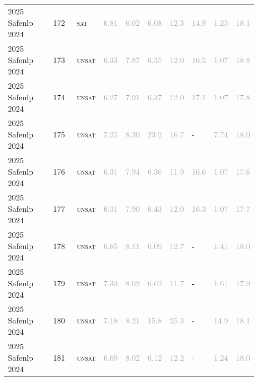 \begin{center}
{\begin{longtable}{@{}llllllllll@{}}
2025 Safenlp 2024 & 172 & ~\textsc{sat} & \textcolor{darkgray}{6.81} & \textcolor{darkgray}{6.02} & \textcolor{darkgray}{6.08} & \textcolor{darkgray}{12.3} & \textcolor{darkgray}{14.9} & \textcolor{darkgray}{1.25} & \textcolor{darkgray}{18.1} \\
2025 Safenlp 2024 & 173 & ~\textsc{unsat} & \textcolor{darkgray}{6.33} & \textcolor{darkgray}{7.87} & \textcolor{darkgray}{6.35} & \textcolor{darkgray}{12.0} & \textcolor{darkgray}{16.5} & \textcolor{darkgray}{1.07} & \textcolor{darkgray}{18.8} \\
2025 Safenlp 2024 & 174 & ~\textsc{unsat} & \textcolor{darkgray}{6.27} & \textcolor{darkgray}{7.91} & \textcolor{darkgray}{6.37} & \textcolor{darkgray}{12.0} & \textcolor{darkgray}{17.1} & \textcolor{darkgray}{1.07} & \textcolor{darkgray}{17.8} \\
2025 Safenlp 2024 & 175 & ~\textsc{unsat} & \textcolor{darkgray}{7.25} & \textcolor{darkgray}{8.30} & \textcolor{darkgray}{23.2} & \textcolor{darkgray}{16.7} & - & \textcolor{darkgray}{7.74} & \textcolor{darkgray}{18.0} \\
2025 Safenlp 2024 & 176 & ~\textsc{unsat} & \textcolor{darkgray}{6.31} & \textcolor{darkgray}{7.94} & \textcolor{darkgray}{6.36} & \textcolor{darkgray}{11.9} & \textcolor{darkgray}{16.6} & \textcolor{darkgray}{1.07} & \textcolor{darkgray}{17.6} \\
2025 Safenlp 2024 & 177 & ~\textsc{unsat} & \textcolor{darkgray}{6.31} & \textcolor{darkgray}{7.90} & \textcolor{darkgray}{6.43} & \textcolor{darkgray}{12.0} & \textcolor{darkgray}{16.3} & \textcolor{darkgray}{1.07} & \textcolor{darkgray}{17.7} \\
2025 Safenlp 2024 & 178 & ~\textsc{unsat} & \textcolor{darkgray}{6.85} & \textcolor{darkgray}{8.11} & \textcolor{darkgray}{6.09} & \textcolor{darkgray}{12.7} & - & \textcolor{darkgray}{1.41} & \textcolor{darkgray}{18.0} \\
2025 Safenlp 2024 & 179 & ~\textsc{unsat} & \textcolor{darkgray}{7.33} & \textcolor{darkgray}{8.02} & \textcolor{darkgray}{6.62} & \textcolor{darkgray}{11.7} & - & \textcolor{darkgray}{1.61} & \textcolor{darkgray}{17.9} \\
2025 Safenlp 2024 & 180 & ~\textsc{unsat} & \textcolor{darkgray}{7.18} & \textcolor{darkgray}{8.21} & \textcolor{darkgray}{15.8} & \textcolor{darkgray}{25.3} & - & \textcolor{darkgray}{14.9} & \textcolor{darkgray}{18.1} \\
2025 Safenlp 2024 & 181 & ~\textsc{unsat} & \textcolor{darkgray}{6.69} & \textcolor{darkgray}{8.02} & \textcolor{darkgray}{6.12} & \textcolor{darkgray}{12.2} & - & \textcolor{darkgray}{1.24} & \textcolor{darkgray}{18.0} \\

\end{longtable}}
\end{center}
